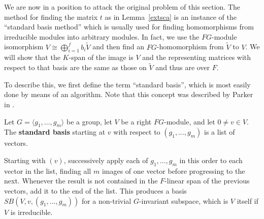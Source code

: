 \bigskip
We are now in a position to attack the original problem of this
section. The method for finding the matrix $t$ as in Lemma~\ref{extsca}
is an instance of the 
``standard basis method'' which is usually used for finding
homomorphisms from irreducible modules into arbitrary modules. In fact, we
use the $FG$-module isomorphism $V \cong 
\bigoplus_{i=1}^f b_i\tilde{V}$ 
and then find an $FG$-homomorphism
from $\tilde{V}$ to $V$. We will show that the $K$-span of the image is $V$
and the representing matrices with respect to that basis
are the same as those on $\tilde{V}$ and thus are over $F$.

To describe this, we first define the term ``standard basis'', which
is most easily done by means of an algorithm. Note that this concept was
described by Parker in \cite[Section~6]{MeatAxeRP}.

\begin{Def} \label{spinup}
Let $G = \langle g_1, \ldots, g_m \rangle$ be a group, 
let $V$ be a right $FG$-module,
and let $0 \neq v \in V$. The \textbf{standard basis} starting at $v$ with
respect to $(g_1,\ldots,g_m)$  is a
list of vectors.

Starting with $(v)$, successively apply each of $g_1, \ldots, g_m$
in this order to each vector in the list, 
finding all $m$ images of one vector before progressing to the next.  
 Whenever the result
is not contained in the $F$-linear span of  the previous vectors, 
add it to the end of the list. This produces
 a basis $SB(V,v,(g_1, \ldots, g_m))$ for a 
non-trivial $G$-invariant subspace, which 
is $V$ itself  if $V$ is irreducible.

\end{Def}


